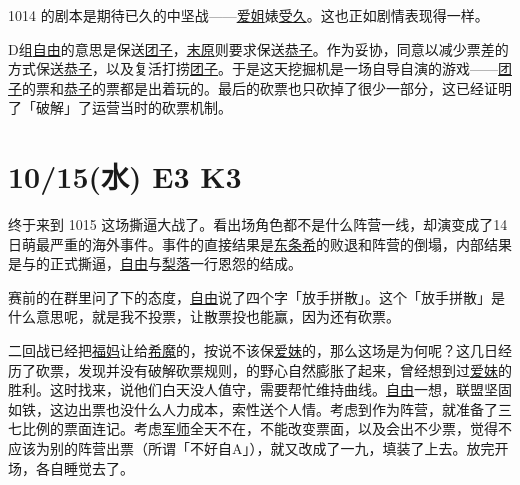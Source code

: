 1014 的剧本是期待已久的中坚战——\uline{爱姐}婊\uline{受久}。这也正如剧情表现得一样。

D组\uline{自由}的意思是保送\uline{团子}，\uline{末原}则要求保送\uline{恭子}。作为妥协，同意以减少票差的方式保送\uline{恭子}，以及复活打捞\uline{团子}。于是这天挖掘机是一场自导自演的游戏——\uline{团子}的票和\uline{恭子}的票都是出着玩的。最后的砍票也只砍掉了很少一部分，这已经证明了「破解」了运营当时的砍票机制。

\section{10/15(水) E3 K3}


终于来到 1015 这场撕逼大战了。看出场角色都不是什么阵营一线，却演变成了14日萌最严重的海外事件。事件的直接结果是\uline{东条希}的败退和阵营的倒塌，内部结果是与的正式撕逼，\uline{自由}与\uline{梨落}一行恩怨的结成。

赛前的在群里问了下的态度，\uline{自由}说了四个字「放手拼散」。这个「放手拼散」是什么意思呢，就是我不投票，让散票投也能赢，因为还有砍票。

二回战已经把\uline{福妈}让给\uline{希魔}的，按说不该保\uline{爱妹}的，那么这场是为何呢？这几日经历了砍票，发现并没有破解砍票规则，的野心自然膨胀了起来，曾经想到过\uline{爱妹}的胜利。这时找来，说他们白天没人值守，需要帮忙维持曲线。\uline{自由}一想，联盟坚固如铁，这边出票也没什么人力成本，索性送个人情。考虑到作为阵营，就准备了三七比例的票面连记。考虑\uline{军师}全天不在，不能改变票面，以及会出不少票，觉得不应该为别的阵营出票（所谓「不好自A」），就又改成了一九，填装了上去。放完开场，各自睡觉去了。

